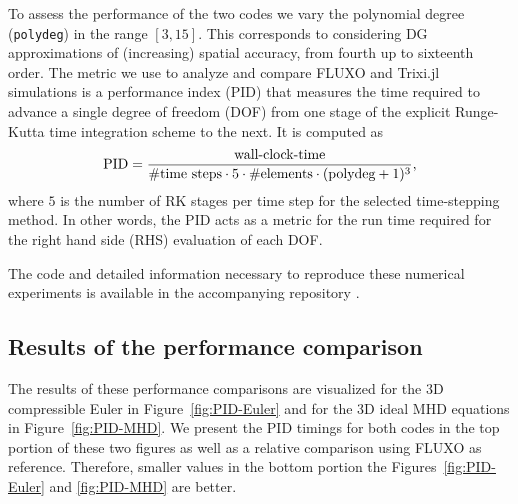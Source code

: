 \documentclass[hidelinks]{juliacon} %
\newcommand{\trixi}{Trixi.jl\xspace}
\begin{document}
To assess the performance of the two codes we vary the polynomial degree
(\lstinline{polydeg}) in the range $[3,15]$.
This corresponds to considering DG approximations of (increasing) spatial accuracy, from fourth up to sixteenth order.
The metric we use to analyze and compare FLUXO and \trixi simulations is a performance index (PID) that
measures the time required to advance a single degree of freedom (DOF) from one stage of the explicit Runge-Kutta
time integration scheme to the next. It is computed as
\begin{equation}
\label{eqn:pid}
\text{PID} = \frac{\text{wall-clock-time}}{\#\text{time steps}\cdot 5\cdot\#\text{elements}\cdot(\text{\lstinline{polydeg}}+1)^3},
\end{equation}
where $5$ is the number of RK stages per time step for the selected time-stepping method. In other words, the PID acts 
as a metric for the run time required for the right hand side (RHS) evaluation of each DOF.

The code and detailed information necessary to reproduce these numerical
experiments is available in the accompanying repository \cite{ranocha2021adaptiveRepro}.

\subsection{Results of the performance comparison}

The results of these performance comparisons are visualized for the 3D compressible Euler
in Figure~\ref{fig:PID-Euler} and for the 3D ideal MHD equations in Figure~\ref{fig:PID-MHD}.
We present the PID timings for both codes in the top portion of these two figures as well as
a relative comparison using FLUXO as reference. Therefore, smaller values in the bottom portion
the Figures~\ref{fig:PID-Euler} and \ref{fig:PID-MHD} are better.
\end{document}
